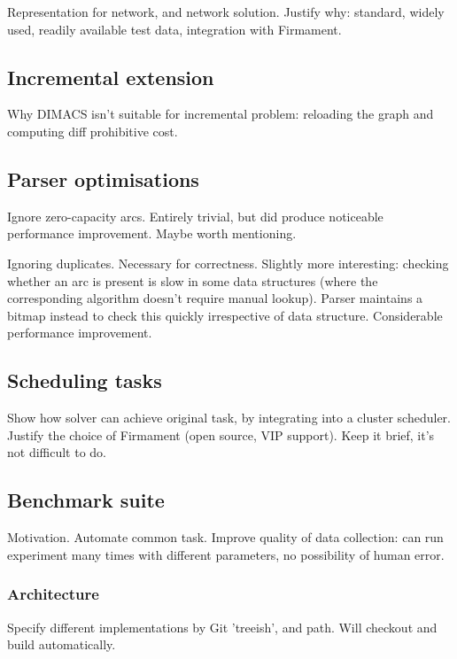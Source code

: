 Representation for network, and network solution. Justify why: standard, widely used, readily available test data, integration with Firmament. 

\subsection{Incremental extension}

Why DIMACS isn't suitable for incremental problem: reloading the graph and computing diff prohibitive cost. 

\subsection{Parser optimisations}

Ignore zero-capacity arcs. Entirely trivial, but did produce noticeable performance improvement. Maybe worth mentioning.

Ignoring duplicates. Necessary for correctness. Slightly more interesting: checking whether an arc is present is slow in some data structures (where the corresponding algorithm doesn't require manual lookup). Parser maintains a bitmap instead to check this quickly irrespective of data structure. Considerable performance improvement. 

\subsection{Scheduling tasks}

Show how solver can achieve original task, by integrating into a cluster scheduler. Justify the choice of Firmament (open source, VIP support). Keep it brief, it's not difficult to do.

\subsection{Benchmark suite} \label{sec:impl-benchmark}

Motivation. Automate common task. Improve quality of data collection: can run experiment many times with different parameters, no possibility of human error. 

\subsubsection{Architecture}

Specify different implementations by Git 'treeish', and path. Will checkout and build automatically. 

